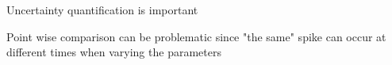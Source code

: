 \documentclass[presentation]{beamer}
\begin{document}
\begin{frame}{Uncertainty quantification is important }

\end{frame}



\begin{frame}{Point wise comparison can be problematic since "the same" spike can occur at different times when varying the parameters}
   \vspace{-5mm}
   \begin{figure}
   \end{figure}
\end{frame}
\end{document}
